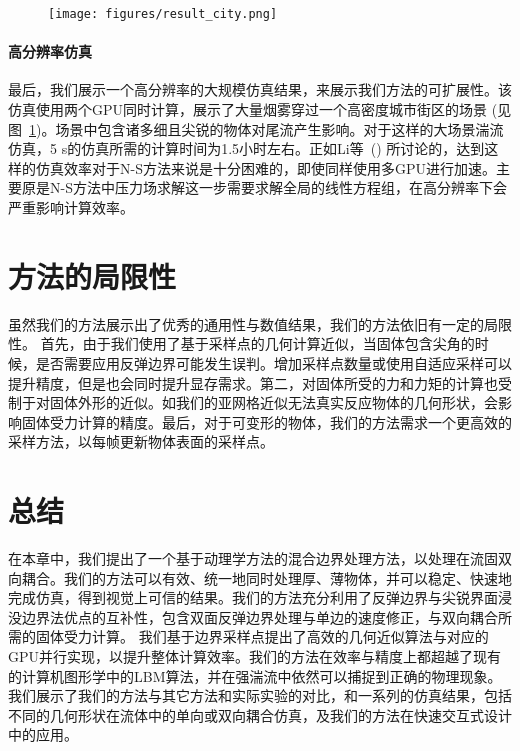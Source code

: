 \begin{figure}[htb]
  \centering
    \texttt{[image: figures/result\_city.png]}
  \label{img:result-city}
\end{figure}

\paragraph{高分辨率仿真}
最后，我们展示一个高分辨率的大规模仿真结果，来展示我们方法的可扩展性。该仿真使用两个GPU同时计算，展示了大量烟雾穿过一个高密度城市街区的场景 (见图~\ref{img:result-city})。场景中包含诸多细且尖锐的物体对尾流产生影响。对于这样的大场景湍流仿真，5 s的仿真所需的计算时间为1.5小时左右。正如Li等~(\citeyear{Li-2020}) 所讨论的，达到这样的仿真效率对于N-S方法来说是十分困难的，即使同样使用多GPU进行加速。主要原是N-S方法中压力场求解这一步需要求解全局的线性方程组，在高分辨率下会严重影响计算效率。

\section{方法的局限性}
虽然我们的方法展示出了优秀的通用性与数值结果，我们的方法依旧有一定的局限性。
首先，由于我们使用了基于采样点的几何计算近似，当固体包含尖角的时候，是否需要应用反弹边界可能发生误判。增加采样点数量或使用自适应采样可以提升精度，但是也会同时提升显存需求。第二，对固体所受的力和力矩的计算也受制于对固体外形的近似。如我们的亚网格近似无法真实反应物体的几何形状，会影响固体受力计算的精度。最后，对于可变形的物体，我们的方法需求一个更高效的采样方法，以每帧更新物体表面的采样点。

\section{总结}
在本章中，我们提出了一个基于动理学方法的混合边界处理方法，以处理在流固双向耦合。我们的方法可以有效、统一地同时处理厚、薄物体，并可以稳定、快速地完成仿真，得到视觉上可信的结果。我们的方法充分利用了反弹边界与尖锐界面浸没边界法优点的互补性，包含双面反弹边界处理与单边的速度修正，与双向耦合所需的固体受力计算。
我们基于边界采样点提出了高效的几何近似算法与对应的GPU并行实现，以提升整体计算效率。我们的方法在效率与精度上都超越了现有的计算机图形学中的LBM算法，并在强湍流中依然可以捕捉到正确的物理现象。
我们展示了我们的方法与其它方法和实际实验的对比，和一系列的仿真结果，包括不同的几何形状在流体中的单向或双向耦合仿真，及我们的方法在快速交互式设计中的应用。